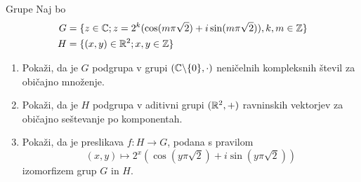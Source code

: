 \begin{frame}{Grupe}
	Naj bo
	\begin{align*}
		G &= \{z \in \mathbb{C}; z=2^{k}(\cos(m\pi \sqrt{2})+i\sin(m\pi \sqrt{2})), k, m \in \mathbb{Z}\}\\
		H &= \{(x,y)\in \mathbb{R} ^2; x, y \in \mathbb{Z}\}
	\end{align*}
	\begin{enumerate}
		\item
			Pokaži, da je $G$ podgrupa v grupi $(\mathbb{C} \backslash \{0\}, \cdot)$
			neničelnih kompleksnih števil za običajno množenje.
		\item
			Pokaži, da je $H$ podgrupa v aditivni grupi $(\mathbb{R} ^2, +)$
			ravninskih vektorjev za običajno seštevanje po komponentah.
		\item
			Pokaži, da je preslikava $f:H\to G$, podana s pravilom
			\[(x,y)\mapsto 2^x(\cos(y\pi \sqrt{2})+ i\sin(y\pi \sqrt{2}))\]
			izomorfizem grup $G$ in $H$.
	\end{enumerate}
\end{frame}

